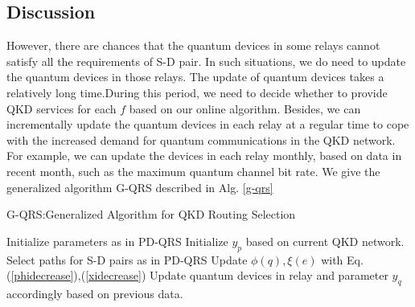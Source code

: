 \subsection{Discussion}
However, there are chances that the quantum devices in some relays cannot satisfy all the requirements of S-D pair. In such situations, we do need to update the quantum devices in those relays. The update of quantum devices takes a relatively long time.During this period, we need to decide whether to provide QKD services for each $f$ based on our online algorithm. Besides, we can incrementally update the quantum devices in each relay at a regular time to cope with the increased demand for quantum communications in the QKD network. For example, we can update the devices in each relay monthly, based on data in recent month, such as the maximum quantum channel bit rate. We give the generalized algorithm G-QRS described in Alg. \ref{g-qrs}

\begin{algorithm}[h]\label{g-qrs}
\caption{G-QRS:Generalized Algorithm for QKD Routing Selection}
\begin{algorithmic}[1]
\STATE  Initialize parameters as in PD-QRS
\STATE Initialize $y_p$ based on current QKD network.
\STATE Select paths for S-D pairs as in PD-QRS
\STATE Update $\phi(q),\xi(e)$ with Eq.(\ref{phidecrease}),(\ref{xidecrease})
\STATE Update quantum devices in relay and parameter $y_q$ accordingly based on previous data.
\end{algorithmic}
\end{algorithm}

